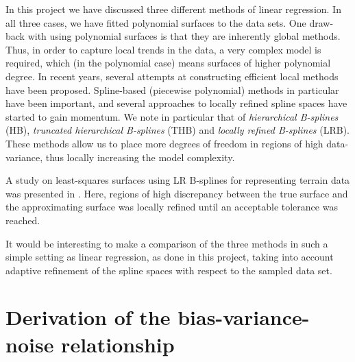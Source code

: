 \documentclass[dvipsnames, article, a4paper, oneside, 12pt]{memoir}
\begin{document}
  In this project we have discussed three different methods of linear
  regression.  In all three cases, we have fitted polynomial surfaces to the
  data sets. One draw-back with using polynomial surfaces is that they are
  inherently global methods. Thus, in order to capture local trends in the
  data, a very complex model is required, which (in the polynomial case) means
  surfaces of higher polynomial degree. In recent years, several attempts at
  constructing efficient local methods have been proposed. Spline-based
  (piecewise polynomial) methods in particular have been important, and several
  approaches to locally refined spline spaces have started to gain momentum.
  We note in particular that of \emph{hierarchical B-splines} (HB),
  \emph{truncated hierarchical B-splines} (THB) and \emph{locally refined
  B-splines} (LRB). These methods allow us to place more degrees of freedom in
  regions of high data-variance, thus locally increasing the model complexity.
  
  A study on least-squares surfaces using LR B-splines for representing terrain
  data was presented in \cite{skyttLocallyRefinedSpline2015}. Here, regions of
  high discrepancy between the true surface and the approximating surface was
  locally refined until an acceptable tolerance was reached.

  It would be interesting to make a comparison of the three methods in such a
  simple setting as linear regression, as done in this project, taking into
  account adaptive refinement of the spline spaces with respect to the sampled
  data set.
 

   

  \appendix
  \chapter{Derivation of the bias-variance-noise relationship}
  \label{ap:derivation}
  
\end{document}
